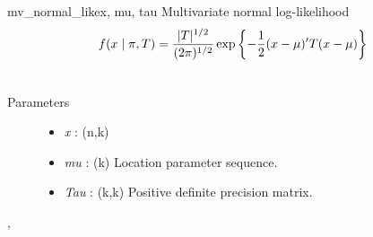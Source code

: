 \hypertarget{pymc.distributions.mv_normal_like}{}\begin{funcdesc}{mv\_normal\_like}{x, mu, tau}
Multivariate normal log-likelihood
\begin{gather}
\begin{split}f(x \mid \pi, T) = \frac{|T|^{1/2}}{(2\pi)^{1/2}} \exp\left\{ -\frac{1}{2} (x-\mu)^{\prime}T(x-\mu) \right\}\end{split}\notag\\\begin{split}\end{split}\notag
\end{gather}\begin{description}
\item[Parameters] \leavevmode\begin{itemize}
\item {}
\emph{x} : (n,k)

\item {}
\emph{mu} : (k) Location parameter sequence.

\item {}
\emph{Tau} : (k,k) Positive definite precision matrix.

\end{itemize}

\end{description}




\hyperlink{pymc.distributions.mv_normal_chol_like}{}, \hyperlink{pymc.distributions.mv_normal_cov_like}{}


\end{funcdesc}

